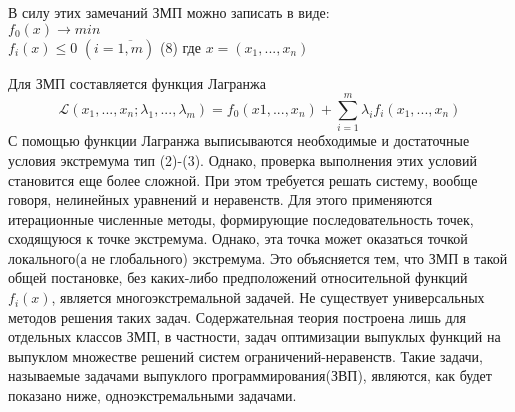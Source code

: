 \noindent В силу этих замечаний ЗМП можно записать в виде: \\
$f_0(x) \rightarrow min$ \\
$f_i(x) \leq 0$ $(i = \overline{1,m})$ (8)
где $x = (x_1,...,x_n)$

Для ЗМП составляется функция Лагранжа
\begin{equation*}
\mathcal{L}(x_1,...,x_n;\lambda_1,...,\lambda_m) = f_0(x1,...,x_n) + \sum_{i=1}^{m} \lambda_i f_i(x_1,...,x_n)
\end{equation*} 
С помощью функции Лагранжа выписываются необходимые и достаточные условия экстремума тип (2)-(3). Однако,  проверка выполнения этих условий становится еще более сложной. При этом требуется решать систему, вообще говоря, нелинейных уравнений и неравенств. Для этого применяются итерационные численные методы, формирующие последовательность точек, сходящуюся к точке экстремума. Однако, эта точка может оказаться точкой локального(а не глобального) экстремума. Это объясняется тем, что ЗМП в такой общей постановке, без каких-либо предположений относительной функций $f_i(x)$, является многоэкстремальной задачей. Не существует универсальных методов решения таких задач. Содержательная теория построена лишь для отдельных классов ЗМП, в частности, задач оптимизации выпуклых функций на выпуклом множестве решений систем ограничений-неравенств. Такие задачи, называемые задачами выпуклого программирования(ЗВП), являются, как будет показано ниже, одноэкстремальными задачами.
